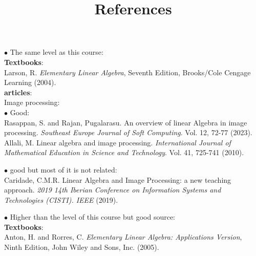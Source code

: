 \documentclass{ximera}
\title{References}
\begin{document}
$\bullet$ The same level as this course:\\

\textbf{Textbooks}:\\

Larson, R. \emph{Elementary Linear Algebra}, Seventh Edition, Brooks/Cole Cengage Learning (2004).\\

\textbf{articles}:\\

Image processing:\\
$\bullet$ Good: \\
Rasappan, S. and Rajan, Pugalarasu. An overview of linear Algebra in image processing. \emph{Southeast Europe Journal of Soft Computing}. Vol. 12, 72-77 (2023). \\

Allali, M. Linear algebra and image processing. \emph{International Journal of Mathematical Education in Science and Technology}. Vol. 41, 725-741 (2010).

$\bullet$ good but most of it is not related: \\

Caridade, C.M.R. Linear Algebra and Image Processing: a new teaching approach. \emph{2019 14th Iberian Conference on Information Systems and Technologies (CISTI). IEEE} (2019).


$\bullet$ Higher than the level of this course but good source:\\

\textbf{Textbooks}:\\

Anton, H. and Rorres, C. \emph{Elementary Linear Algebra: Applications Version}, Ninth Edition, John Wiley and Sons, Inc. (2005). \\
\end{document}
